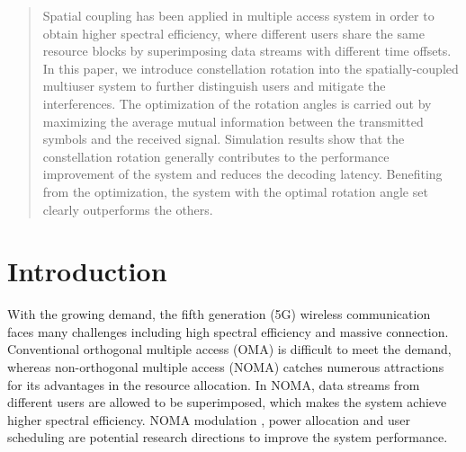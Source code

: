 \documentclass[conference]{IEEEtran}
\begin{document}
\maketitle

\begin{abstract}
Spatial coupling has been applied in multiple access system in order to obtain higher spectral efficiency, where different users share the same resource blocks by superimposing data streams with different time offsets. In this paper, we introduce constellation rotation into the spatially-coupled multiuser system to further distinguish users and mitigate the interferences. The optimization of the rotation angles is carried out by maximizing the average mutual information between the transmitted symbols and the received signal. Simulation results show that the constellation rotation generally contributes to the performance improvement of the system and reduces the decoding latency. Benefiting from the optimization, the system with the optimal rotation angle set clearly outperforms the others.
\end{abstract}





%
\IEEEpeerreviewmaketitle




\section{Introduction}

With the growing demand, the fifth generation (5G) wireless communication faces many challenges including high spectral efficiency and massive connection. Conventional orthogonal multiple access (OMA) is difficult to meet the demand, whereas non-orthogonal multiple access (NOMA) \cite{1} catches numerous attractions for its advantages in the resource allocation. In NOMA, data streams from different users are allowed to be superimposed, which makes the system achieve higher spectral efficiency. NOMA modulation \cite{2}, power allocation and user scheduling \cite{3} are potential research directions to improve the system performance.
\end{document}
